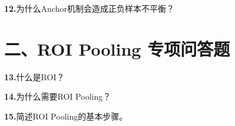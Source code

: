 \documentclass[UTF8,openany,oneside,zihao=-4,fontset=windows]{ctexbook}
\newif\ifshowsolutions
\newcommand{\Question}[2]{%
  \par\Needspace{4\baselineskip}\medskip
  \noindent\textbf{\color{MVBlue}#1}\quad #2\par
}
\newenvironment{AnswerBox}{\begin{tcolorbox}[breakable,colback=MVLight,colframe=MVBlue!45,title={参考答案},fonttitle=\bfseries,boxrule=0.55pt,arc=1.5mm,left=2mm,right=2mm,top=1.5mm,bottom=1.5mm]}{\end{tcolorbox}}
\newcommand{\PracticeSpace}[1]{\ifshowsolutions\else\par\vspace{#1}\par\fi}
\begin{document}
\else
\PracticeSpace{2.4cm}
\fi
\Question{12.}{为什么Anchor机制会造成正负样本不平衡？}
\ifshowsolutions
\begin{AnswerBox}
\par 特征图上会产生大量Anchor，但图像中的真实目标数量通常较少。
\par\noindent\textbf{因此：}
\par\noindent\textbullet\quad 只有少数Anchor与真实框高度重合，成为正样本；
\par 大部分Anchor都属于背景，成为负样本。
\par 训练时通常不会使用全部Anchor，而是按照一定比例采样正负样本，例如尽量保持一定的正负样本比例。
\end{AnswerBox}
\else
\PracticeSpace{2.4cm}
\fi
\section{二、ROI Pooling 专项问答题}
\Question{13.}{什么是ROI？}
\ifshowsolutions
\begin{AnswerBox}
\par ROI是Region of Interest，即感兴趣区域。
\par 在Faster R-CNN中，ROI通常指RPN生成的Proposal映射到共享特征图后所对应的区域。
\par\noindent\textbf{每个ROI可能具有不同的：}
\par\noindent\textbullet\quad 高度；
\par\noindent\textbullet\quad 宽度；
\par 位置。
\end{AnswerBox}
\else
\PracticeSpace{2.4cm}
\fi
\Question{14.}{为什么需要ROI Pooling？}
\ifshowsolutions
\begin{AnswerBox}
\par RPN产生的候选区域大小不同，但后续全连接层要求输入特征长度固定。
\par ROI Pooling可以将任意大小的候选区域转换为固定大小的特征图，例如：
\par 7×7
\par 因此不同尺寸的候选框都可以送入同一个分类和边界框回归网络。
\end{AnswerBox}
\else
\PracticeSpace{2.4cm}
\fi
\Question{15.}{简述ROI Pooling的基本步骤。}
\ifshowsolutions
\end{document}
